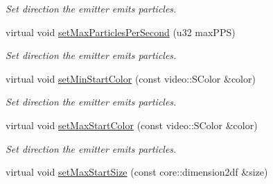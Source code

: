 \begin{DoxyCompactItemize}
\begin{DoxyCompactList}\small\item\em Set direction the emitter emits particles. \end{DoxyCompactList}\item 
\hypertarget{classirr_1_1scene_1_1_c_particle_cylinder_emitter_aec0bf02d44f6aee89582dec8d360953a}{virtual void \hyperlink{classirr_1_1scene_1_1_c_particle_cylinder_emitter_aec0bf02d44f6aee89582dec8d360953a}{set\-Max\-Particles\-Per\-Second} (u32 max\-P\-P\-S)}\label{classirr_1_1scene_1_1_c_particle_cylinder_emitter_aec0bf02d44f6aee89582dec8d360953a}

\begin{DoxyCompactList}\small\item\em Set direction the emitter emits particles. \end{DoxyCompactList}\item 
\hypertarget{classirr_1_1scene_1_1_c_particle_cylinder_emitter_a4eb2dbd0077916c7ceb5a55d27021bb2}{virtual void \hyperlink{classirr_1_1scene_1_1_c_particle_cylinder_emitter_a4eb2dbd0077916c7ceb5a55d27021bb2}{set\-Min\-Start\-Color} (const video\-::\-S\-Color \&color)}\label{classirr_1_1scene_1_1_c_particle_cylinder_emitter_a4eb2dbd0077916c7ceb5a55d27021bb2}

\begin{DoxyCompactList}\small\item\em Set direction the emitter emits particles. \end{DoxyCompactList}\item 
\hypertarget{classirr_1_1scene_1_1_c_particle_cylinder_emitter_aed4d3ec1fd908616ecb912bdd10df9d1}{virtual void \hyperlink{classirr_1_1scene_1_1_c_particle_cylinder_emitter_aed4d3ec1fd908616ecb912bdd10df9d1}{set\-Max\-Start\-Color} (const video\-::\-S\-Color \&color)}\label{classirr_1_1scene_1_1_c_particle_cylinder_emitter_aed4d3ec1fd908616ecb912bdd10df9d1}

\begin{DoxyCompactList}\small\item\em Set direction the emitter emits particles. \end{DoxyCompactList}\item 
\hypertarget{classirr_1_1scene_1_1_c_particle_cylinder_emitter_ac2493dc7cd86cb70f3a6c1d6e6002485}{virtual void \hyperlink{classirr_1_1scene_1_1_c_particle_cylinder_emitter_ac2493dc7cd86cb70f3a6c1d6e6002485}{set\-Max\-Start\-Size} (const core\-::dimension2df \&size)}\label{classirr_1_1scene_1_1_c_particle_cylinder_emitter_ac2493dc7cd86cb70f3a6c1d6e6002485}


\end{DoxyCompactItemize}
